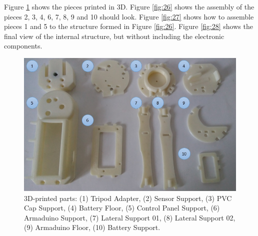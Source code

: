 \documentclass[12pt,letterpaper]{article}
\numberwithin{figure}{section}
\numberwithin{equation}{section}
\numberwithin{table}{section}
\begin{document}
Figure \ref{fig:25} shows the pieces printed in 3D. Figure \ref{fig:26} shows the assembly of the pieces 2, 3, 4, 6, 7, 8, 9 and 10 should look. Figure \ref{fig:27} shows how to assemble pieces 1 and 5 to the structure formed in Figure \ref{fig:26}. Figure \ref{fig:28} shows the final view of the internal structure, but without including the electronic components.

 \begin{figure}[H]
     \centering
     \includegraphics[scale=0.7]{Figuras/figure_25.jpg}
     \caption{3D-printed parts: (1) Tripod Adapter, (2) Sensor Support, (3) PVC Cap Support, (4) Battery Floor, (5) Control Panel Support, (6) Armaduino Support, (7) Lateral Support 01, (8) Lateral Support 02, (9) Armaduino Floor, (10) Battery Support.}
     \label{fig:25}
 \end{figure}
\end{document}
